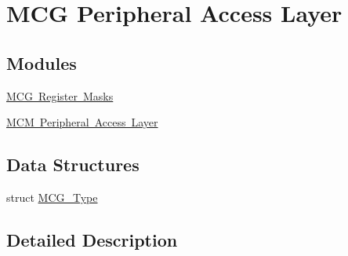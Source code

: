 \hypertarget{group___m_c_g___peripheral___access___layer}{}\section{M\+CG Peripheral Access Layer}
\label{group___m_c_g___peripheral___access___layer}
\subsection*{Modules}
\begin{DoxyCompactItemize}
\item 
\mbox{\hyperlink{group___m_c_g___register___masks}{M\+C\+G Register Masks}}
\item 
\mbox{\hyperlink{group___m_c_m___peripheral___access___layer}{M\+C\+M Peripheral Access Layer}}
\end{DoxyCompactItemize}
\subsection*{Data Structures}
\begin{DoxyCompactItemize}
\item 
struct \mbox{\hyperlink{struct_m_c_g___type}{M\+C\+G\+\_\+\+Type}}
\end{DoxyCompactItemize}


\subsection{Detailed Description}
